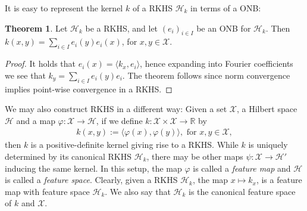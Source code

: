 \documentclass[10pt,twoside,openany,final]{memoir}
\theoremstyle{definition}
\newtheorem{theorem}{Theorem}[chapter]
\theoremstyle{Break}
\newcommand{\R}{\mathbb{R}}
\renewcommand{\H}{\mathcal{H}}
\begin{document}
It is easy to represent the kernel $k$ of a RKHS $\H_k$ in terms of a ONB:
\begin{theorem}
	Let $\H_k$ be a RKHS, and let $(e_i)_{i \in I}$ be an ONB for $\H_k$. Then $k(x,y) = \sum_{i \in I} e_i(y) e_i(x)$, for $x, y \in \mathcal{X}$.
	\label{paul3.4}
\end{theorem}
\begin{proof}
	It holds that $e_i(x) = \langle k_x , e_i\rangle$, hence expanding into Fourier coefficients we see that $k_y = \sum_{i \in I}e_i(y) e_i$. The theorem follows since norm convergence implies point-wise convergence in a RKHS.
\end{proof}

We may also construct RKHS in a different way: Given a set $\mathcal{X}$, a Hilbert space $\H$ and a map $\varphi \colon \mathcal{X} \to \H$, if we define $k \colon \mathcal{X} \times \mathcal{X} \to \R$ by 
\begin{align*}
	k(x,y) := \langle \varphi(x), \varphi(y) \rangle, \text{ for } x,y \in \mathcal{X},
\end{align*}
then $k$ is a positive-definite kernel giving rise to a RKHS. While $k$ is uniquely determined by its canonical RKHS $\H_k$, there may be other maps $\psi \colon \mathcal{X} \to \H'$ inducing the same kernel. In this setup, the map $\varphi$ is called a \emph{feature map} and $\H$ is called a \emph{feature space}. Clearly, given a RKHS $\H_k$, the map $x \mapsto k_x$, is a feature map with feature space $\H_k$. We also say that $\H_k$ is the canonical feature space of $k$ and $\mathcal{X}$.
\end{document}
